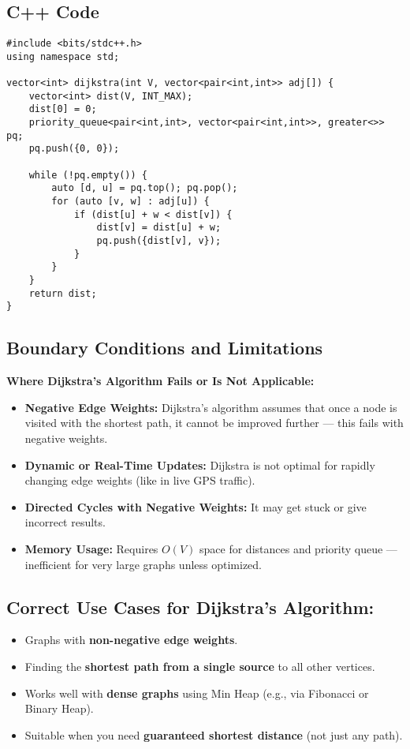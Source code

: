 \documentclass[a4paper,14pt]{extarticle}
\begin{document}
\subsection*{C++ Code}
\begin{lstlisting}[style=cpp, caption={Dijkstra’s Algorithm in C++}]
#include <bits/stdc++.h>
using namespace std;

vector<int> dijkstra(int V, vector<pair<int,int>> adj[]) {
    vector<int> dist(V, INT_MAX);
    dist[0] = 0;
    priority_queue<pair<int,int>, vector<pair<int,int>>, greater<>> pq;
    pq.push({0, 0});

    while (!pq.empty()) {
        auto [d, u] = pq.top(); pq.pop();
        for (auto [v, w] : adj[u]) {
            if (dist[u] + w < dist[v]) {
                dist[v] = dist[u] + w;
                pq.push({dist[v], v});
            }
        }
    }
    return dist;
}
\end{lstlisting}

\subsection{Boundary Conditions and Limitations}

\textbf{Where Dijkstra's Algorithm Fails or Is Not Applicable:}
\begin{itemize}
    \item \textbf{Negative Edge Weights:} Dijkstra's algorithm assumes that once a node is visited with the shortest path, it cannot be improved further — this fails with negative weights.
    \item \textbf{Dynamic or Real-Time Updates:} Dijkstra is not optimal for rapidly changing edge weights (like in live GPS traffic).
    \item \textbf{Directed Cycles with Negative Weights:} It may get stuck or give incorrect results.
    \item \textbf{Memory Usage:} Requires \(O(V)\) space for distances and priority queue — inefficient for very large graphs unless optimized.
\end{itemize}

\subsection{Correct Use Cases for Dijkstra's Algorithm:}
\begin{itemize}
    \item Graphs with \textbf{non-negative edge weights}.
    \item Finding the \textbf{shortest path from a single source} to all other vertices.
    \item Works well with \textbf{dense graphs} using Min Heap (e.g., via Fibonacci or Binary Heap).
    \item Suitable when you need \textbf{guaranteed shortest distance} (not just any path).
\end{itemize}
\end{document}
